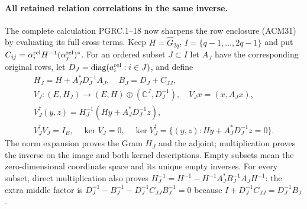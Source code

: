 \paragraph{All retained relation correlations in the same inverse.}
The complete calculation PGRC.1--18 now sharpens the row enclosure
(ACM31) by evaluating its full cross terms. Keep
$H=\widehat G_{2q}$, $I=\{q-1,\ldots,2q-1\}$ and put
$C_{ij}=\alpha_i^{\rm rel}H^{-1}(\alpha_j^{\rm rel})^*$.
For an ordered subset $J\subset I$ let $A_J$ have the corresponding
original rows, let $D_J=\operatorname{diag}(a_i^{\rm rel}:i\in J)$,
and define
\[
\begin{gathered}
 H_J=H+A_J^*D_J^{-1}A_J,\quad B_J=D_J+C_{JJ},\\
 V_J:(E,H_J)\longrightarrow(E,H)\oplus(\mathbb{C}^J,D_J^{-1}),
 \quad V_Jx=(x,A_Jx),\\
 V_J^\dagger(y,z)=H_J^{-1}(Hy+A_J^*D_J^{-1}z),\\
 V_J^\dagger V_J=I_E,\quad\ker V_J=0,\quad
 \ker V_J^\dagger=\{(y,z):Hy+A_J^*D_J^{-1}z=0\}.
\end{gathered}\tag{ACM32}
\]
The norm expansion proves the Gram $H_J$ and the adjoint;
multiplication proves the inverse on the image and both kernel
descriptions. Empty subsets mean the zero-dimensional coordinate
space and its unique empty inverses. For every subset, direct
multiplication also proves
$H_J^{-1}=H^{-1}-H^{-1}A_J^*B_J^{-1}A_JH^{-1}$:
the extra middle factor is
$D_J^{-1}-B_J^{-1}-D_J^{-1}C_{JJ}B_J^{-1}=0$
because $I+D_J^{-1}C_{JJ}=D_J^{-1}B_J$.


